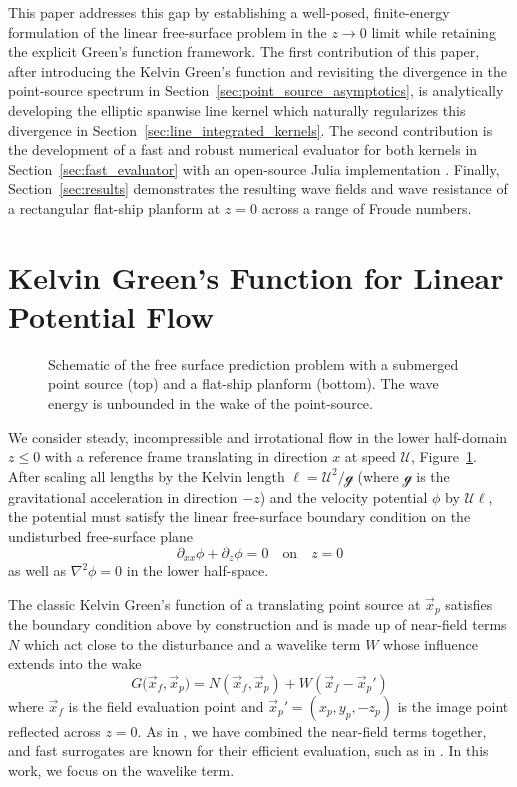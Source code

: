\documentclass[]{JFM-FLM_Au}
\begin{document}
This paper addresses this gap by establishing a well-posed, finite-energy formulation of the linear free-surface problem in the $z\to 0$ limit while retaining the explicit Green's function framework. The first contribution of this paper, after introducing the Kelvin Green's function and revisiting the divergence in the point-source spectrum in Section~\ref{sec:point_source_asymptotics}, is analytically developing the elliptic spanwise line kernel which naturally regularizes this divergence in Section~\ref{sec:line_integrated_kernels}. The second contribution is the development of a fast and robust numerical evaluator for both kernels in Section~\ref{sec:fast_evaluator} with an open-source Julia implementation \citep{weymouth_kelvinflatship_2026}. Finally, Section~\ref{sec:results} demonstrates the resulting wave fields and wave resistance of a rectangular flat-ship planform at $z=0$ across a range of Froude numbers.

\section{Kelvin Green's Function for Linear Potential Flow}

\begin{figure}
    \centering
    \def\svgwidth{0.75\textwidth}    
    \vspace{-3mm}
    \caption{Schematic of the free surface prediction problem with a submerged point source (top) and a flat-ship planform (bottom). The wave energy is unbounded in the wake of the point-source.}
    \label{fig:schematic}
\end{figure}

We consider steady, incompressible and irrotational flow in the lower half-domain $z\le0$ with a reference frame translating in direction $x$ at speed $\mathscr{U}$, Figure~\ref{fig:schematic}. After scaling all lengths by the Kelvin length $\ell=\mathscr{U}^2/\mathscr{g}$ (where $\mathscr{g}$ is the gravitational acceleration in direction $-z$) and the velocity potential $\phi$ by $\mathscr{U}\ell$, the potential must satisfy the linear free-surface boundary condition on the undisturbed free-surface plane
\[
\partial_{xx}\phi + \partial_z\phi = 0\quad\text{on}\quad z=0
\]
as well as $\nabla^2\phi = 0$ in the lower half-space.

The classic Kelvin Green's function of a translating point source at $\vec x_p$ satisfies the boundary condition above by construction and is made up of near-field terms $N$ which act close to the disturbance and a wavelike term $W$ whose influence extends into the wake
\[
G\bigl(\vec x_f,\vec x_p\bigr) = N(\vec x_f,\vec x_p) + W(\vec x_f - \vec x_p\!')
\]
where $\vec x_f$ is the field evaluation point and $\vec x_p\!'=(x_p,y_p,-z_p)$ is the image point reflected across $z=0$. As in \cite{noblesse_neumannmichell_2013}, we have combined the near-field terms together, and fast surrogates are known for their efficient evaluation, such as in \cite{newman_evaluation_1987}. In this work, we focus on the wavelike term.
\end{document}
